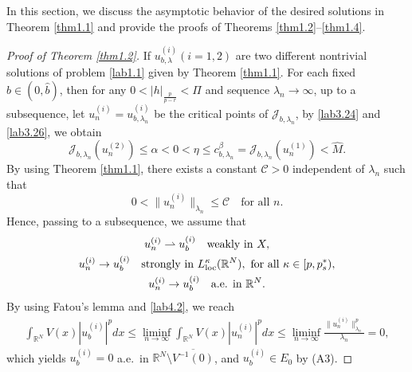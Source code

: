\documentclass[reqno]{amsart}
\begin{document}
In this section, we discuss the asymptotic behavior of the desired solutions in 
Theorem \ref{thm1.1} and provide the proofs of Theorems \ref{thm1.2}--\ref{thm1.4}.

\begin{proof}[Proof of Theorem \ref{thm1.2}]
If $u^{(i)}_{b,\lambda} (i=1, 2)$ are two different nontrivial solutions of 
problem \eqref{lab1.1} given by Theorem \ref{thm1.1}. For each fixed 
$b\in(0, \widehat{b})$, then for any $0<|h|_{\frac{p}{p-r}}<\Pi$ and sequence 
$\lambda_n\to \infty$, up to a subsequence, let $u^{(i)}_n=u^{(i)}_{b, \lambda_n}$ 
be the critical points of $\mathcal{J}_{b, \lambda_n}$, by \eqref{lab3.24} and 
\eqref{lab3.26}, we obtain
\begin{equation}\label{lab4.1}
\mathcal{J}_{b, \lambda_n}(u^{(2)}_n)\leq\alpha
<0<\eta\leq c_{b, \lambda_n}^\beta=\mathcal{J}_{b, \lambda_n}(u^{(1)}_n)<\widehat{M}.
\end{equation}
By using Theorem \ref{thm1.1}, there exists a constant $\mathcal{C}>0$ independent 
of $\lambda_n$ such that
\begin{equation}\label{lab4.2}
0<\|u_n^{(i)}\|_{\lambda_n}\leq \mathcal{C} \quad \text{for all } n.
\end{equation}
Hence, passing to a subsequence, we assume that
\begin{equation}\label{lab4.3}
\begin{gathered}
u_n^{(i)}\rightharpoonup u_{b}^{(i)} \quad \text{weakly in}\ X, \\
u_n^{(i)}\to  u_{b}^{(i)}     \quad \text{strongly in }
 L^\kappa_{\rm loc}(\mathbb{R}^N),  \text{ for all } \kappa\in[p,p^*_s), \\
u_n^{(i)}\to   u_{b}^{(i)}    \quad \text{a.e. in}\ \mathbb{R}^N.
\end{gathered}
\end{equation}
By using Fatou's lemma and \eqref{lab4.2}, we reach
\begin{align*}
\int_{\mathbb{R}^N}V(x)|u_{b}^{(i)}|^pdx
\leq \liminf_{n\to \infty}\int_{\mathbb{R}^N}V(x)|u^{(i)}_n|^pdx
\leq \liminf_{n\to \infty}\frac{\|u^{(i)}_n\|^p_ {{\lambda_n}}}{\lambda_n}=0,
\end{align*}
which yields $u_{b}^{(i)}=0$ a.e.\  in $\mathbb{R}^N\setminus \overline{V^{-1}(0)}$, 
and $u_{b}^{(i)}\in E_0$ by (A3).


\end{proof}
\end{document}
